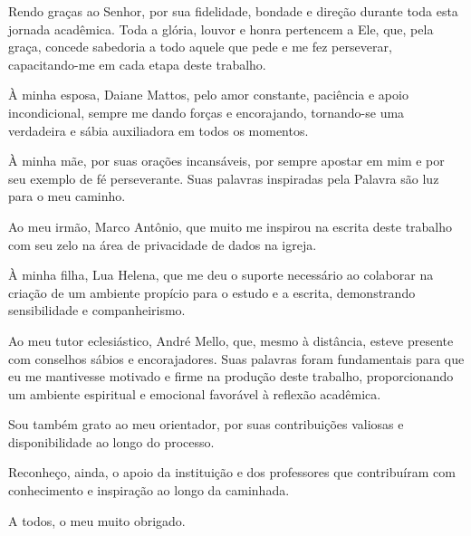 \begin{agradecimentos}
Rendo graças ao Senhor, por sua fidelidade, bondade e direção durante toda esta jornada acadêmica. Toda a glória, louvor e honra pertencem a Ele, que, pela graça, concede sabedoria a todo aquele que pede e me fez perseverar, capacitando-me em cada etapa deste trabalho.

À minha esposa, Daiane Mattos, pelo amor constante, paciência e apoio incondicional, sempre me dando forças e encorajando, tornando-se uma verdadeira e sábia auxiliadora em todos os momentos.

À minha mãe, por suas orações incansáveis, por sempre apostar em mim e por seu exemplo de fé perseverante. Suas palavras inspiradas pela Palavra são luz para o meu caminho.

Ao meu irmão, Marco Antônio, que muito me inspirou na escrita deste trabalho com seu zelo na área de privacidade de dados na igreja.

À minha filha, Lua Helena, que me deu o suporte necessário ao colaborar na criação de um ambiente propício para o estudo e a escrita, demonstrando sensibilidade e companheirismo.

Ao meu tutor eclesiástico, André Mello, que, mesmo à distância, esteve presente com conselhos sábios e encorajadores. Suas palavras foram fundamentais para que eu me mantivesse motivado e firme na produção deste trabalho, proporcionando um ambiente espiritual e emocional favorável à reflexão acadêmica.

Sou também grato ao meu orientador, por suas contribuições valiosas e disponibilidade ao longo do processo.

Reconheço, ainda, o apoio da instituição e dos professores que contribuíram com conhecimento e inspiração ao longo da caminhada.

A todos, o meu muito obrigado.
\end{agradecimentos}